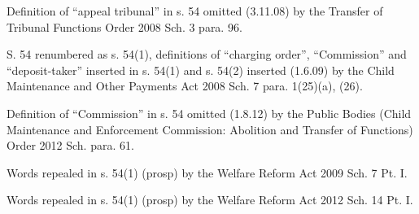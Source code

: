 \documentclass[12pt,a4paper]{article}
\begin{document}
{Definition of ``appeal tribunal'' in s. 54 omitted (3.11.08) by the Transfer of Tribunal Functions Order 2008 Sch. 3 para. 96.

S. 54 renumbered as s. 54(1), definitions of ``charging order'', ``Commission'' and ``deposit-taker'' inserted in s. 54(1) and s. 54(2) inserted (1.6.09) by the Child Maintenance and Other Payments Act 2008 Sch. 7 para. 1(25)(a), (26).

Definition of ``Commission'' in s. 54 omitted (1.8.12) by the Public Bodies (Child Maintenance and Enforcement Commission: Abolition and Transfer of Functions) Order 2012 Sch. para. 61.

Words repealed in s. 54(1) (prosp) by the Welfare Reform Act 2009 Sch. 7 Pt. I.

Words repealed in s. 54(1) (prosp) by the Welfare Reform Act 2012 Sch. 14 Pt. I.
}
\end{document}

